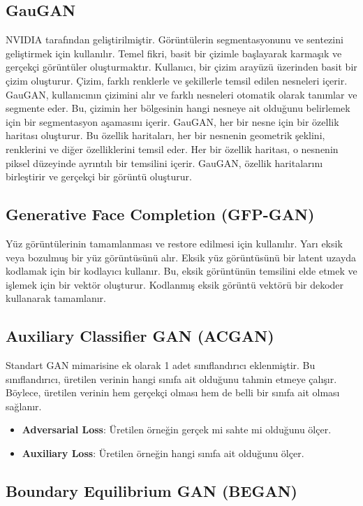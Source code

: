 \subsection{GauGAN}
NVIDIA tarafından geliştirilmiştir. Görüntülerin segmentasyonunu ve sentezini geliştirmek için kullanılır. Temel fikri, basit bir çizimle başlayarak karmaşık ve gerçekçi görüntüler oluşturmaktır. Kullanıcı, bir çizim arayüzü üzerinden basit bir çizim oluşturur. Çizim, farklı renklerle ve şekillerle temsil edilen nesneleri içerir. GauGAN, kullanıcının çizimini alır ve farklı nesneleri otomatik olarak tanımlar ve segmente eder. Bu, çizimin her bölgesinin hangi nesneye ait olduğunu belirlemek için bir segmentasyon aşamasını içerir. GauGAN, her bir nesne için bir özellik haritası oluşturur. Bu özellik haritaları, her bir nesnenin geometrik şeklini, renklerini ve diğer özelliklerini temsil eder. Her bir özellik haritası, o nesnenin piksel düzeyinde ayrıntılı bir temsilini içerir. GauGAN, özellik haritalarını birleştirir ve gerçekçi bir görüntü oluşturur.

\subsection{Generative Face Completion (GFP-GAN)}
Yüz görüntülerinin tamamlanması ve restore edilmesi için kullanılır. Yarı eksik veya bozulmuş bir yüz görüntüsünü alır. Eksik yüz görüntüsünü bir latent uzayda kodlamak için bir kodlayıcı kullanır. Bu, eksik görüntünün temsilini elde etmek ve işlemek için bir vektör oluşturur. Kodlanmış eksik görüntü vektörü bir dekoder kullanarak tamamlanır. 

\subsection{Auxiliary Classifier GAN (ACGAN)}
Standart GAN mimarisine ek olarak 1 adet sınıflandırıcı eklenmiştir. Bu sınıflandırıcı, üretilen verinin hangi sınıfa ait olduğunu tahmin etmeye çalışır. Böylece, üretilen verinin hem gerçekçi olması hem de belli bir sınıfa ait olması sağlanır.

\begin{itemize}
    \item \textbf{Adversarial Loss}: Üretilen örneğin gerçek mi sahte mi olduğunu ölçer.
    \item \textbf{Auxiliary Loss}: Üretilen örneğin hangi sınıfa ait olduğunu ölçer.
\end{itemize}

\subsection{Boundary Equilibrium GAN (BEGAN)}


